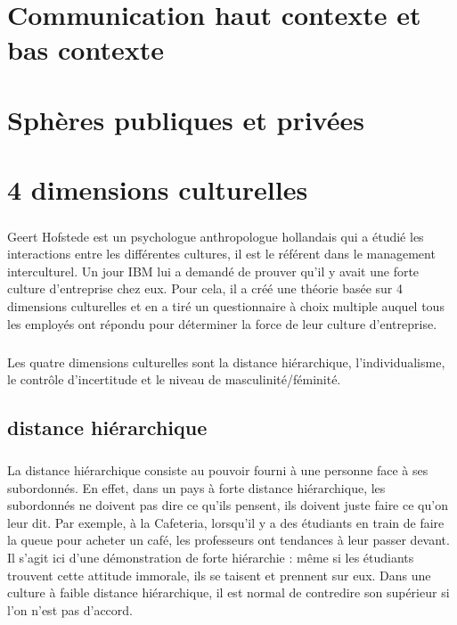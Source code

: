 \chapter{Communication haut contexte et bas contexte}

\chapter{Sphères publiques et privées}

\chapter{4 dimensions culturelles}
\paragraph{}
Geert Hofstede est un psychologue anthropologue hollandais qui a étudié les interactions entre les différentes cultures, il est le référent dans le management interculturel. Un jour IBM lui a demandé de prouver qu’il y avait une forte culture d’entreprise chez eux. Pour cela, il a créé une théorie basée sur 4 dimensions culturelles et en a tiré un questionnaire à choix multiple auquel tous les employés ont répondu pour déterminer la force de leur culture d’entreprise.
\paragraph{}
Les quatre dimensions culturelles sont la distance hiérarchique, l’individualisme, le contrôle d’incertitude et le niveau de masculinité/féminité.

\section{distance hiérarchique}
\paragraph{}
La distance hiérarchique consiste au pouvoir fourni à une personne face à ses subordonnés. En effet, dans un pays à forte distance hiérarchique, les subordonnés ne doivent pas dire ce qu’ils pensent, ils doivent juste faire ce qu’on leur dit. Par exemple, à la Cafeteria, lorsqu’il y a des étudiants en train de faire la queue pour acheter un café, les professeurs ont tendances à leur passer devant. Il s’agit ici d’une démonstration de forte hiérarchie : même si les étudiants trouvent cette attitude immorale, ils se taisent et prennent sur eux. Dans une culture à faible distance hiérarchique, il est normal de contredire son supérieur si l’on n’est pas d’accord. 

